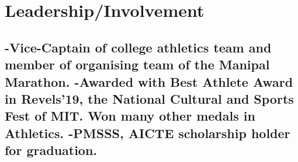 \documentclass{article}
\begin{document}





\section{Leadership/Involvement}
\subsection{%
    \textmd{-Vice-Captain of college athletics team and member of organising team of the Manipal Marathon.}\newline
    \textmd{-Awarded with Best Athlete Award in Revels'19, the National Cultural and Sports Fest of MIT. Won many other medals in Athletics. }\newline
    \textmd{-PMSSS, AICTE scholarship holder for graduation.}}



\end{document}
